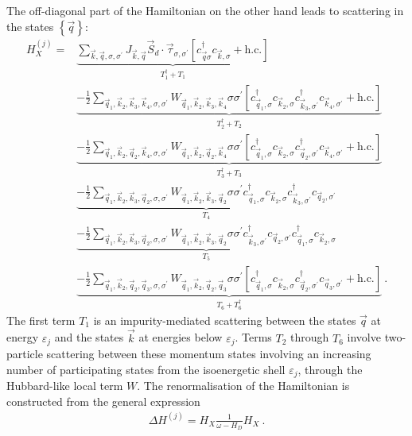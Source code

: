 \documentclass{revtex4-2}
\begin{document}
The off-diagonal part of the Hamiltonian on the other hand leads to scattering in the states \(\left\{ \vec q \right\} \):
\begin{equation}\begin{aligned}
	H_X^{(j)} =& \underbrace{\sum_{\vec k, \vec q, \sigma,\sigma^\prime}J_{\vec k, \vec q} \vec{S}_d\cdot\vec{\tau}_{\sigma,\sigma^\prime}\left[c^\dagger_{\vec q\sigma}c_{\vec k,\sigma} + \text{h.c.}\right]}_{T_1^\dagger + T_1} \\
		   &\underbrace{- \frac{1}{2}\sum_{\vec q_1,\vec k_2, \vec k_3, \vec k_4,\sigma,\sigma^\prime}W_{\vec q_1,\vec k_2,\vec k_3,\vec k_4} \sigma\sigma^\prime \left[c^\dagger_{\vec q_1,\sigma}c_{\vec k_2,\sigma}c^\dagger_{\vec k_3,\sigma^\prime}c_{\vec k_4,\sigma^\prime} + \text{h.c.}\right]}_{T_2^\dagger + T_2}\\
		   &\underbrace{- \frac{1}{2}\sum_{\vec q_1,\vec k_2, \vec q_2, \vec k_4,\sigma,\sigma^\prime}W_{\vec q_1,\vec k_2, \vec q_2, \vec k_4} \sigma\sigma^\prime \left[c^\dagger_{\vec q_1,\sigma}c_{\vec k_2,\sigma}c^\dagger_{\vec q_2,\sigma^\prime}c_{\vec k_4,\sigma^\prime} + \text{h.c.}\right]}_{T_3^\dagger + T_3}\\
		   &\underbrace{- \frac{1}{2}\sum_{\vec q_1,\vec k_2,\vec k_3,\vec q_2,\sigma,\sigma^\prime}W_{\vec q_1,\vec k_2,\vec k_3,\vec q_2} \sigma\sigma^\prime c^\dagger_{\vec q_1,\sigma}c_{\vec k_2,\sigma}c^\dagger_{\vec k_3,\sigma^\prime}c_{\vec q_2,\sigma^\prime}}_{T_4}\\
		   &\underbrace{- \frac{1}{2}\sum_{\vec q_1,\vec k_2,\vec k_3,\vec q_2,\sigma,\sigma^\prime}W_{\vec q_1,\vec k_2,\vec k_3,\vec q_2} \sigma\sigma^\prime c^\dagger_{\vec k_3,\sigma^\prime}c_{\vec q_2,\sigma^\prime}c^\dagger_{\vec q_1,\sigma}c_{\vec k_2,\sigma}}_{T_5}\\
		   &\underbrace{- \frac{1}{2}\sum_{\vec q_1,\vec k_2, \vec q_2, \vec q_3,\sigma,\sigma^\prime}W_{\vec q_1,\vec k_2, \vec q_2, \vec q_3} \sigma\sigma^\prime \left[c^\dagger_{\vec q_1,\sigma}c_{\vec k_2,\sigma}c^\dagger_{\vec q_2,\sigma^\prime}c_{\vec q_3,\sigma^\prime} + \text{h.c.}\right]}_{T_6 + T_6^\dagger}~.
\end{aligned}\end{equation}
The first term \(T_1\) is an impurity-mediated scattering between the states \(\vec q\) at energy \(\varepsilon_j\) and the states \(\vec k\) at energies below \(\varepsilon_j\). Terms \(T_2\) through \(T_6\) involve two-particle scattering between these momentum states involving an increasing number of participating states from the isoenergetic shell \(\varepsilon_j\), through the Hubbard-like local term \(W\). The renormalisation of the Hamiltonian is constructed from the general expression
\begin{equation}\begin{aligned}
	\Delta H^{(j)} = H_X \frac{1}{\omega- H_D} H_X~.
\end{aligned}\end{equation}
\end{document}
